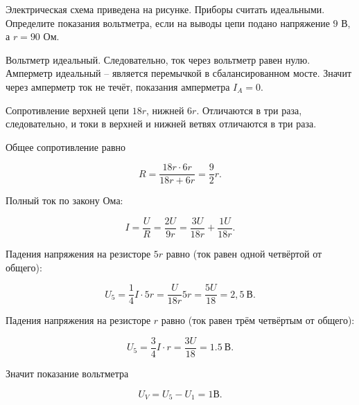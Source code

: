 
Электрическая схема приведена на рисунке. Приборы считать идеальными. Определите показания вольтметра, 
если на выводы цепи подано напряжение $ 9 $ В, \linebreak а $ r=90 $ Ом.



\solutionSection

Вольтметр идеальный. Следовательно, ток через вольтметр равен нулю. Амперметр идеальный – 
является перемычкой в сбалансированном мосте. Значит через амперметр ток не течёт, показания амперметра $I_A=0$.

Сопротивление верхней цепи $18r$, нижней $6r$. Отличаются в три раза, следовательно, и токи в верхней и 
нижней ветвях отличаются в три раза.

Общее сопротивление равно

$$R=\frac{18r \cdot 6r}{18r+6r}=\frac{9}{2} r.$$

Полный ток по закону Ома:

$$I=\frac{U}{R}=\frac{2U}{9r}=\frac{3U}{18r}+\frac{1U}{18r}.$$

Падения напряжения на резисторе $5r$ равно (ток равен одной четвёртой от общего):

$$U_5=\frac{1}{4} I \cdot 5r=\frac{U}{18 r} 5r=\frac{5U}{18}=2,5 \: \text{В}.$$

Падения напряжения на резисторе $r$ равно (ток равен трём четвёртым от общего):

$$U_5=\frac{3}{4} I \cdot r=\frac{3U}{18}=1.5 \: \text{В}.$$

Значит показание вольтметра

$$U_V=U_5-U_1=1 \text{В}.$$

